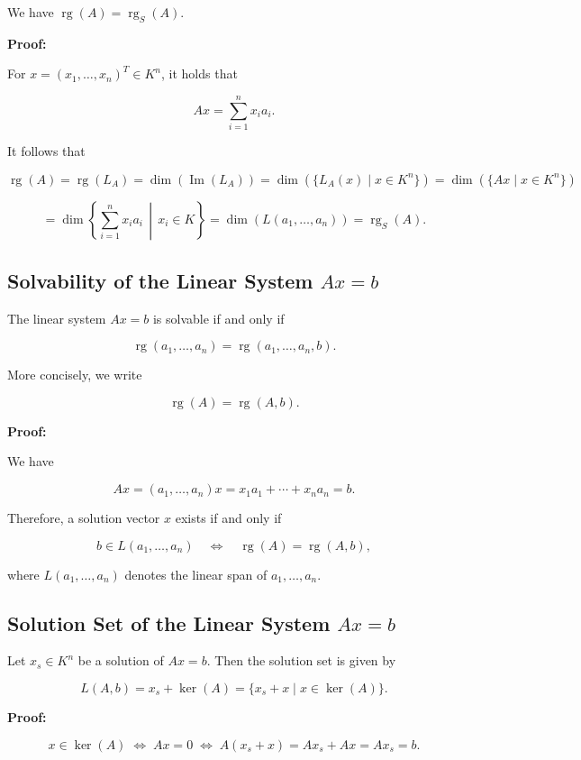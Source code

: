 We have \(\operatorname{rg}(A) = \operatorname{rg}_S(A)\).

\textbf{Proof:} 

For \(x = {(x_1, \ldots, x_n)}^T \in K^n\), it holds that

\[
	Ax = \sum_{i=1}^{n} x_i a_i.
\]

It follows that

\[
	\operatorname{rg}(A) = \operatorname{rg}(L_A) = \dim(\operatorname{Im}(L_A))
	= \dim\left(\{L_A(x) \mid x \in K^n\}\right)
	= \dim\left(\{Ax \mid x \in K^n\}\right)
\]

\[
	= \dim\left\{ \sum_{i=1}^{n} x_i a_i \,\middle|\, x_i \in K \right\}
	= \dim(L(a_1, \ldots, a_n)) = \operatorname{rg}_S(A).
\]

\subsection{Solvability of the Linear System \texorpdfstring{\(Ax = b\)}{}}

The linear system \(Ax = b\) is solvable if and only if

\[
	\operatorname{rg}(a_1, \ldots, a_n) = \operatorname{rg}(a_1, \ldots, a_n, b).
\]

More concisely, we write

\[
	\operatorname{rg}(A) = \operatorname{rg}(A, b).
\]

\textbf{Proof:} 

We have

\[
	Ax = (a_1, \ldots, a_n)x = x_1 a_1 + \cdots + x_n a_n = b.
\]

Therefore, a solution vector \(x\) exists if and only if

\[
	b \in L(a_1, \ldots, a_n) \quad \Leftrightarrow \quad \operatorname{rg}(A) = \operatorname{rg}(A, b),
\]

where \(L(a_1, \ldots, a_n)\) denotes the linear span of \(a_1, \ldots, a_n\).

\subsection{Solution Set of the Linear System \texorpdfstring{\(Ax = b\)}{}}

Let \(x_s \in K^n\) be a solution of \(Ax = b\). Then the solution set is given by

\[
	L(A, b) = x_s + \ker(A) = \{x_s + x \mid x \in \ker(A)\}.
\]

\textbf{Proof:}

\[
	x \in \ker(A) \;\Leftrightarrow\; Ax = 0 \;\Leftrightarrow\; A(x_s + x) = Ax_s + Ax = Ax_s = b.
\]

